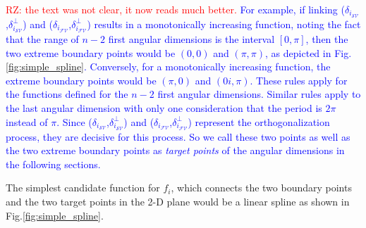\textcolor{red}{RZ: the text was not clear, it now reads much better. }
\textcolor{blue}{For example, if linking ($\delta_{i_{{\mathcal{SV}}}}$,$\delta^{\perp}_{i_{{\mathcal{SV}}}}$) and ($\delta_{i_{{\mathcal{FV}}}}$,$\delta^{\perp}_{i_{{\mathcal{FV}}}}$) results in a monotonically increasing function, noting the fact that the range of $n-2$ first angular dimensions is the interval $[0, \pi]$, then the two extreme boundary points would be $(0,0)$ and $(\pi,\pi)$, as depicted in Fig. \ref{fig:simple_spline}. Conversely, for a monotonically increasing function, the extreme boundary points would be $(\pi,0)$ and $(0i,\pi)$. These rules apply for the functions defined for the $n-2$ first angular dimensions. 
Similar rules apply to the last angular dimension with only one consideration that the period is $2\pi$ instead of $\pi$. Since  ($\delta_{i_{{\mathcal{SV}}}}$,$\delta^{\perp}_{i_{{\mathcal{SV}}}}$) and ($\delta_{i_{{\mathcal{FV}}}}$,$\delta^{\perp}_{i_{{\mathcal{FV}}}}$) represent the orthogonalization process, they are decisive for this process. So we call these two points as well as the two extreme boundary points as \textit{target points} of the angular dimensions in the following sections.}

The simplest candidate function for $f_i$, which connects the two boundary points and the two target points in the 2-D plane would be a linear spline as shown in Fig.\ref{fig:simple_spline}.


